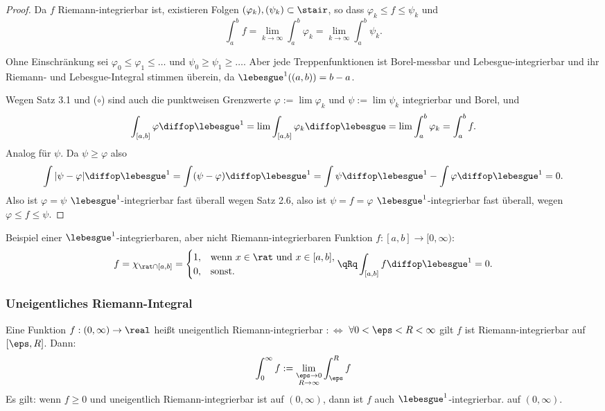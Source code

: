 \begin{proof}
 Da $f$ Riemann-integrierbar ist, existieren Folgen $(\varphi_k), (\psi_k) \subset \stair$, so dass $\varphi_k \le f \le \psi_k$ und
 \[ \int_a^b f = \lim_{k\to\infty} \int_a^b \varphi_k = \lim_{k\to\infty} \int_a^b \psi_k. \tag{$\circ$} \]

 Ohne Einschränkung sei $\varphi_0 \le \varphi_1 \le \ldots$ und $\psi_0 \ge \psi_1 \ge \ldots$. Aber jede Treppenfunktionen ist Borel-messbar und Lebesgue-integrierbar und ihr Riemann- und Lebesgue-Integral stimmen überein, da $\lebesgue^1( (a,b) ) = b - a$.

 Wegen Satz 3.1 und ($\circ$) sind auch die punktweisen Grenzwerte $\varphi := \lim \varphi_k$ und $\psi := \lim \psi_k$ integrierbar und Borel, und
 \[ \int_{[a,b]} \varphi \diffop \lebesgue^1 = \lim \int_{[a,b]} \varphi_k \diffop \lebesgue = \lim \int_a^b \varphi_k = \int_a^b f. \]
 Analog für $\psi$. Da $\psi \ge \varphi$ also
 \[ \int | \psi - \varphi | \diffop \lebesgue^1 = \int (\psi - \varphi) \diffop \lebesgue^1 = \int \psi \diffop \lebesgue^1 - \int \varphi \diffop \lebesgue^1 = 0. \]
 Also ist $\varphi = \psi$ $\lebesgue^1$-integrierbar fast überall wegen Satz 2.6, also ist $\psi = f = \varphi$ $\lebesgue^1$-integrierbar fast überall, wegen $\varphi \le f \le \psi$.
\end{proof}

Beispiel einer $\lebesgue^1$-integrierbaren, aber nicht Riemann-integrierbaren Funktion $f\colon[a,b] \to [0,\infty)$:
\[ f = \chi_{\rat \cap [a,b]} = \begin{cases} 1, &\text{wenn } x \in \rat \text{ und } x \in [a,b], \\
                                 0, &\text{sonst.}
                                \end{cases}
   \qRq \int_{[a,b]} f \diffop \lebesgue^1 = 0. \]
   
\subsubsection*{Uneigentliches Riemann-Integral}
Eine Funktion $f:(0,\infty) \to \real$ heißt uneigentlich Riemann-integrierbar $:\Leftrightarrow$ $\forall 0 < \eps < R < \infty$ gilt $f$ ist Riemann-integrierbar auf $[\eps,R]$. Dann:
\[ \int_0^\infty f := \lim_{\substack{\eps \to 0 \\ R \to \infty}} \int_\eps^R f \]
Es gilt: wenn $f \ge 0$ und uneigentlich Riemann-integrierbar ist auf $(0,\infty)$, dann ist $f$ auch $\lebesgue^1$-integrierbar. auf $(0,\infty)$.

